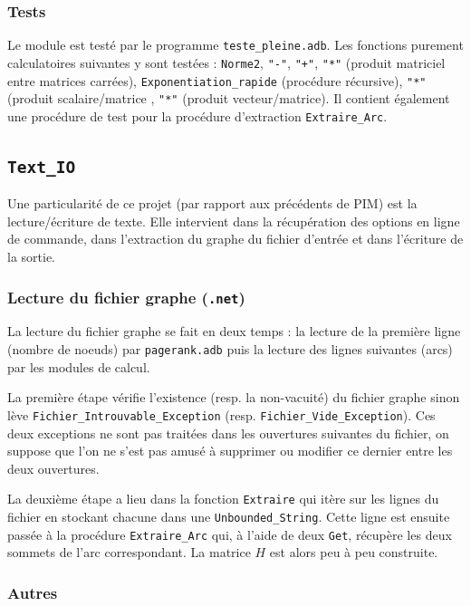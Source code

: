 \documentclass{article}
\begin{document}
\subsubsection{Tests}

Le module est testé par le programme \texttt{teste\_pleine.adb}. Les fonctions purement calculatoires suivantes y sont testées : \texttt{Norme2}, \texttt{"-"}, \texttt{"+"}, \texttt{"*"} (produit matriciel entre matrices carrées), \texttt{Exponentiation\_rapide} (procédure récursive), \texttt{"*"} (produit scalaire/matrice , \texttt{"*"} (produit vecteur/matrice). Il contient également une procédure de test pour la procédure d'extraction \texttt{Extraire\_Arc}.

\subsection{\texttt{Text\_IO}}

Une particularité de ce projet (par rapport aux précédents de PIM) est la lecture/écriture de texte. Elle intervient dans la récupération des options en ligne de commande, dans l'extraction du graphe du fichier d'entrée et dans l'écriture de la sortie.

\subsubsection{Lecture du fichier graphe (\texttt{.net})}

La lecture du fichier graphe se fait en deux temps : la lecture de la première ligne (nombre de noeuds) par \texttt{pagerank.adb} puis la lecture des lignes suivantes (arcs) par les modules de calcul.

La première étape vérifie l'existence (resp. la non-vacuité) du fichier graphe sinon lève \texttt{Fichier\_Introuvable\_Exception} (resp. \texttt{Fichier\_Vide\_Exception}). Ces deux exceptions ne sont pas traitées dans les ouvertures suivantes du fichier, on suppose que l'on ne s'est pas amusé à supprimer ou modifier ce dernier entre les deux ouvertures.

La deuxième étape a lieu dans la fonction \texttt{Extraire} qui itère sur les lignes du fichier en stockant chacune dans une \texttt{Unbounded\_String}. Cette ligne est ensuite passée à la procédure \texttt{Extraire\_Arc} qui, à l'aide de deux \texttt{Get}, récupère les deux sommets de l'arc correspondant. La matrice $H$ est alors peu à peu construite.

\subsubsection{Autres}
\end{document}
